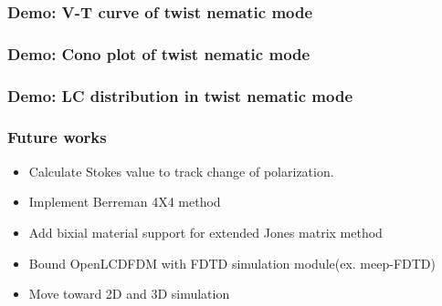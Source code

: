 \documentclass{beamer}
\begin{document}
\begin{frame}
\frametitle{Demo: V-T curve of twist nematic mode}
\end{frame}
\begin{frame}
\frametitle{Demo: Cono plot of twist nematic mode}
\end{frame}
\begin{frame}
\frametitle{Demo: LC distribution in twist nematic mode}
\end{frame}
\begin{frame}
\frametitle{Future works}
\begin{itemize}
\item Calculate Stokes value to track change of polarization.
\item Implement Berreman 4X4 method
\item Add bixial material support for extended Jones matrix method
\item Bound OpenLCDFDM with FDTD simulation module(ex. meep-FDTD)
\item Move toward 2D and 3D simulation
\end{itemize}
\end{frame}
\end{document}

